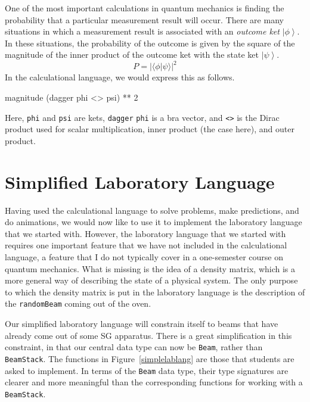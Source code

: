 \documentclass[12pt]{article}
\newcommand{\DataTypeTok}[1]{\textcolor[rgb]{0.56,0.13,0.00}{{#1}}}
\newcommand{\DecValTok}[1]{\textcolor[rgb]{0.25,0.63,0.44}{{#1}}}
\newcommand{\FunctionTok}[1]{\textcolor[rgb]{0.02,0.16,0.49}{{#1}}}
\newcommand{\OperatorTok}[1]{\textcolor[rgb]{0.40,0.40,0.40}{{#1}}}
\newcommand{\NormalTok}[1]{{#1}}
\newcommand{\ket}[1]{\left| #1 \right\rangle}
\newcommand{\abs}[1]{\left| #1 \right|}
\begin{document}
One of the most important calculations in quantum mechanics
is finding the probability that a particular measurement
result will occur.
There are many situations in which a measurement result is associated
with an \emph{outcome ket} $\ket{\phi}$.
In these situations, the probability of the
outcome is given by the square of the magnitude of the inner product
of the outcome ket with the state ket $\ket{\psi}$.
\[
P = \abs{\langle \phi | \psi \rangle}^2
\]
In the calculational language, we would express this as follows.
\begin{Highlighting}[]
\FunctionTok{magnitude} \NormalTok{(}\FunctionTok{dagger} \FunctionTok{phi} \OperatorTok{<>} \FunctionTok{psi}\NormalTok{) }\OperatorTok{**} \DecValTok{2}
\end{Highlighting}
Here, \FunctionTok{\texttt{phi}} and \FunctionTok{\texttt{psi}} are kets,
\FunctionTok{\texttt{dagger}} \FunctionTok{\texttt{phi}} is a bra vector,
and \OperatorTok{\texttt{<>}} is the Dirac product used for scalar multiplication,
inner product (the case here), and outer product.

\section{Simplified Laboratory Language}
\label{implablang}

Having used the calculational language to solve problems,
make predictions, and do animations, we would now like to use
it to implement the laboratory language that we started with.
However, the laboratory language that we started with
requires one important feature that we have not included
in the calculational language, a feature that I do not typically
cover in a one-semester course on quantum mechanics.
What is missing is the idea of a density matrix, which is
a more general way of describing the state of a physical
system.  The only purpose to which the density matrix is put
in the laboratory language is the description of the
\FunctionTok{\texttt{randomBeam}} coming out of the oven.

Our simplified laboratory language will constrain itself
to beams that have already come out of some SG apparatus.
There is a great simplification in this constraint,
in that our central data type can now be \DataTypeTok{\texttt{Beam}},
rather than \DataTypeTok{\texttt{BeamStack}}.
The functions in Figure~\ref{simplelablang} are those that students
are asked to implement.  In terms of the \DataTypeTok{\texttt{Beam}}
data type, their type signatures are clearer and more meaningful
than the corresponding functions for working with a
\DataTypeTok{\texttt{BeamStack}}.
\end{document}
